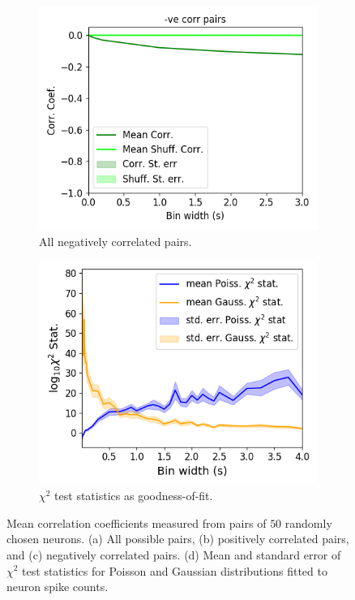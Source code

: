 \documentclass[a4paper,12pt]{article}
\theoremstyle{definition}
\begin{document}
\begin{figure}[h]
\begin{subfigure}[h]{0.5\linewidth}
        \end{subfigure}
        \begin{subfigure}[h]{0.5\linewidth}
            \includegraphics[width=\linewidth]{figures/Krebs_corr_neg_pairs.png}
            \caption{All negatively correlated pairs.}
            \label{fig:correlations_neg_pairs}
        \end{subfigure}
        \begin{subfigure}[h]{0.5\linewidth}
            \includegraphics[width=\linewidth]{figures/Krebs_stats_by_bin_width.png}
            \caption{$\chi^2$ test statistics as goodness-of-fit.}
            \label{fig:chi_squared_fits}
        \end{subfigure}
        \caption{Mean correlation coefficients measured from pairs of $50$ randomly chosen neurons. (a) All possible pairs, (b) positively correlated pairs, and (c) negatively correlated pairs. (d) Mean and standard error of $\chi^2$ test statistics for Poisson and Gaussian distributions fitted to neuron spike counts.}
        \label{fig:correlations_vs_bin_widths}
    \end{figure}
\end{document}
